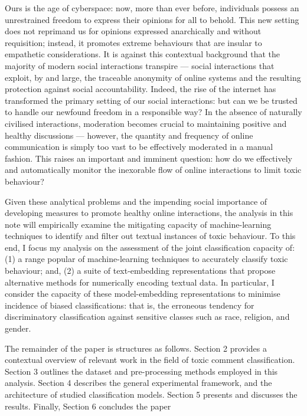 
Ours is the age of cyberspace: now, more than ever before, individuals possess an unrestrained freedom to express their opinions for all to behold. 
This new setting does not reprimand us for opinions expressed anarchically and without requisition; instead, it promotes extreme behaviours that are insular to empathetic considerations.
It is against this contextual background that the majority of modern social interactions transpire --- social interactions that exploit, by and large, the traceable anonymity of online systems and the resulting protection against social accountability. 
Indeed, the rise of the internet has transformed the primary setting of our social interactions: but can we be trusted to handle our newfound freedom in a responsible way?
In the absence of naturally civilised interactions, moderation becomes crucial to maintaining positive and healthy discussions --- however, the quantity and frequency of online communication is simply too vast to be effectively moderated in a manual fashion. This raises an important and imminent question: how do we effectively and automatically monitor the inexorable flow of online interactions to limit toxic behaviour?

Given these analytical problems and the impending social importance of developing measures to promote healthy online interactions, the analysis in this note will empirically examine the mitigating capacity of machine-learning techniques to identify and filter out textual instances of toxic behaviour.
To this end, I focus my analysis on the assessment of the joint classification capacity of: (1) a range popular of machine-learning techniques to accurately classify toxic behaviour; and, (2) a suite of text-embedding representations that propose alternative methods for numerically encoding textual data. 
In particular, I consider the capacity of these model-embedding representations to minimise incidence of biased classifications: that is, the erroneous tendency for discriminatory classification against sensitive classes such as race, religion, and gender.

The remainder of the paper is structures as follows. Section 2 provides a contextual overview of relevant work in the field of toxic comment classification. Section 3 outlines the dataset and pre-processing methods employed in this analysis. Section 4 describes the general experimental framework, and the architecture of studied classification models. Section 5 presents and discusses the results. Finally, Section 6 concludes the paper


